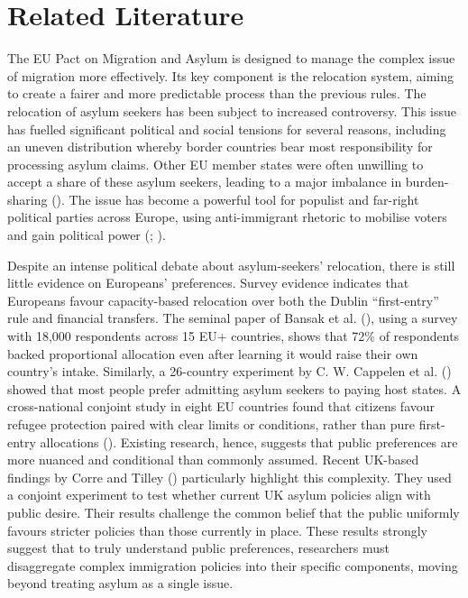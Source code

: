 \documentclass[
  12pt,
  a4paper,
]{article}
\begin{document}
\section{Related Literature}\label{related-literature}

The EU Pact on Migration and Asylum is designed to manage the complex issue of migration more effectively. Its key component is the relocation system, aiming to create a fairer and more predictable process than the previous rules. The relocation of asylum seekers has been subject to increased controversy. This issue has fuelled significant political and social tensions for several reasons, including an uneven distribution whereby border countries bear most responsibility for processing asylum claims. Other EU member states were often unwilling to accept a share of these asylum seekers, leading to a major imbalance in burden-sharing (). The issue has become a powerful tool for populist and far-right political parties across Europe, using anti-immigrant rhetoric to mobilise voters and gain political power (; ).

Despite an intense political debate about asylum-seekers' relocation, there is still little evidence on Europeans' preferences. Survey evidence indicates that Europeans favour capacity-based relocation over both the Dublin ``first-entry'' rule and financial transfers. The seminal paper of Bansak et al. (), using a survey with 18,000 respondents across 15 EU+ countries, shows that 72\% of respondents backed proportional allocation even after learning it would raise their own country's intake. Similarly, a 26-country experiment by C. W. Cappelen et al. () showed that most people prefer admitting asylum seekers to paying host states. A cross-national conjoint study in eight EU countries found that citizens favour refugee protection paired with clear limits or conditions, rather than pure first-entry allocations (). Existing research, hence, suggests that public preferences are more nuanced and conditional than commonly assumed. Recent UK-based findings by Corre and Tilley () particularly highlight this complexity. They used a conjoint experiment to test whether current UK asylum policies align with public desire. Their results challenge the common belief that the public uniformly favours stricter policies than those currently in place. These results strongly suggest that to truly understand public preferences, researchers must disaggregate complex immigration policies into their specific components, moving beyond treating asylum as a single issue.
\end{document}
